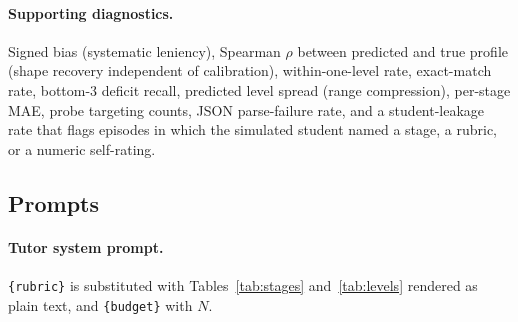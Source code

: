 \paragraph{Supporting diagnostics.} Signed bias (systematic leniency),
Spearman $\rho$ between predicted and true profile (shape recovery
independent of calibration), within-one-level rate, exact-match rate,
bottom-$3$ deficit recall, predicted level spread (range compression),
per-stage MAE, probe targeting counts, JSON parse-failure rate, and a
student-leakage rate that flags episodes in which the simulated student named
a stage, a rubric, or a numeric self-rating.

\subsection{Prompts}
\label{app:prompts}


\paragraph{Tutor system prompt.} \texttt{\{rubric\}} is substituted with
Tables~\ref{tab:stages} and~\ref{tab:levels} rendered as plain text, and
\texttt{\{budget\}} with $N$.

